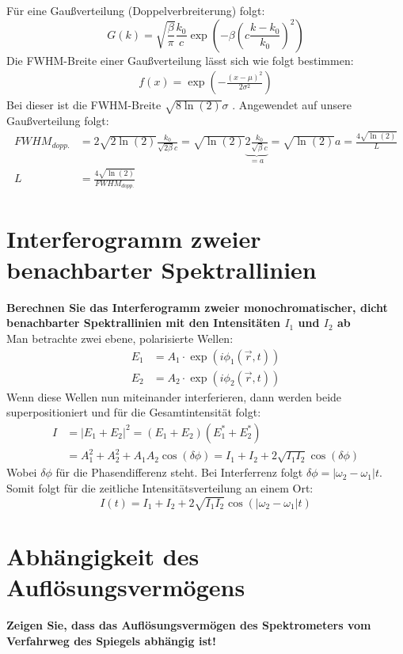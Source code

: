 Für eine Gaußverteilung (Doppelverbreiterung) folgt:
\begin{equation}
    G(k)=\sqrt{\frac{\beta}{\pi}}\frac{k_0}{c}\exp\left(-\beta\left(c\frac{k-k_0}{k_0}\right)^2\right)
\end{equation}
Die FWHM-Breite einer Gaußverteilung lässt sich wie folgt bestimmen:
\begin{align}
    f(x)=\exp\left(-\frac{\left(x-\mu\right)^2}{2\sigma^2}\right)
\end{align}
Bei dieser ist die FWHM-Breite $\sqrt{8\ln(2)}\sigma$ \citep[vgl.]{FWHM-Gauss}.
Angewendet auf unsere Gaußverteilung folgt:
\begin{align}
    FWHM_{dopp.}&=2\sqrt{2\ln(2)}\frac{k_0}{\sqrt{2\beta}c}=\sqrt{\ln(2)}\underbrace{2\frac{k_0}{\sqrt{\beta}c}}_{=a}=\sqrt{\ln(2)}a=\frac{4\sqrt{\ln(2)}}{L}\\
    L&=\frac{4\sqrt{\ln(2)}}{FWHM_{dopp.}}
\end{align}
\section{Interferogramm zweier benachbarter Spektrallinien}
\textbf{Berechnen Sie das Interferogramm zweier monochromatischer, dicht benachbarter Spektrallinien mit den Intensitäten $I_1$ und $I_2$ ab}\\

Man betrachte zwei ebene, polarisierte Wellen:
\begin{align}
    E_1&=A_1\cdot\exp\left(i\phi_1\left(\vec{r},t\right)\right)\\
    E_2&=A_2\cdot\exp\left(i\phi_2\left(\vec{r},t\right)\right)
\end{align}
Wenn diese Wellen nun miteinander interferieren, dann werden beide superpositioniert und für die Gesamtintensität folgt:
\begin{align}
    I&=\left|E_1+E_2\right|^2=\left(E_1+E_2\right)\left(E_1^*+E_2^*\right)\\
    &=A_1^2+A_2^2+A_1A_2\cos(\delta\phi)=I_1+I_2+2\sqrt{I_1I_2}\cos(\delta\phi)
\end{align}
Wobei $\delta\phi$ für die Phasendifferenz steht.
Bei Interferrenz folgt $\delta\phi=\left|\omega_2-\omega_1\right|t$.
Somit folgt für die zeitliche Intensitätsverteilung an einem Ort:
\begin{equation}
    I(t)=I_1+I_2+2\sqrt{I_1I_2}\cos(\left|\omega_2-\omega_1\right|t)
\end{equation}
\section{Abhängigkeit des Auflösungsvermögens}
\textbf{Zeigen Sie, dass das Auflösungsvermögen des Spektrometers vom Verfahrweg des Spiegels abhängig ist!}\\

